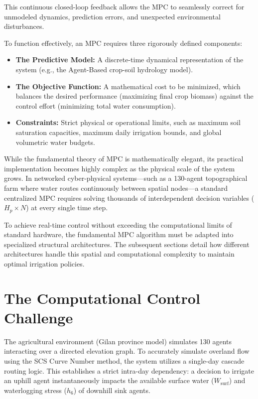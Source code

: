 \documentclass[12pt, a4paper]{article}
\begin{document}
This continuous closed-loop feedback allows the MPC to seamlessly correct for unmodeled dynamics, prediction errors, and unexpected environmental disturbances. 

To function effectively, an MPC requires three rigorously defined components:
\begin{itemize}
    \item \textbf{The Predictive Model:} A discrete-time dynamical representation of the system (e.g., the Agent-Based crop-soil hydrology model).
    \item \textbf{The Objective Function:} A mathematical cost to be minimized, which balances the desired performance (maximizing final crop biomass) against the control effort (minimizing total water consumption).
    \item \textbf{Constraints:} Strict physical or operational limits, such as maximum soil saturation capacities, maximum daily irrigation bounds, and global volumetric water budgets.
\end{itemize}

While the fundamental theory of MPC is mathematically elegant, its practical implementation becomes highly complex as the physical scale of the system grows. In networked cyber-physical systems—such as a 130-agent topographical farm where water routes continuously between spatial nodes—a standard centralized MPC requires solving thousands of interdependent decision variables ($H_p \times N$) at every single time step. 

To achieve real-time control without exceeding the computational limits of standard hardware, the fundamental MPC algorithm must be adapted into specialized structural architectures. The subsequent sections detail how different architectures handle this spatial and computational complexity to maintain optimal irrigation policies.

\section{The Computational Control Challenge}
\label{sec:challenge}
The agricultural environment (Gilan province model) simulates 130 agents interacting over a directed elevation graph. To accurately simulate overland flow using the SCS Curve Number method, the system utilizes a single-day cascade routing logic. This establishes a strict intra-day dependency: a decision to irrigate an uphill agent instantaneously impacts the available surface water ($W_{\text{surf}}$) and waterlogging stress ($h_6$) of downhill sink agents.
\end{document}
